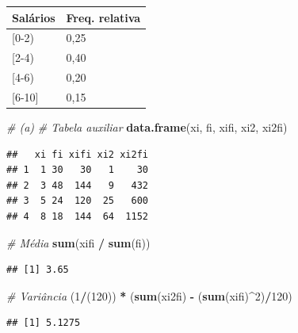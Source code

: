 \documentclass[]{article}
\newenvironment{Shaded}{\begin{snugshade}}{\end{snugshade}}
\newcommand{\KeywordTok}[1]{\textcolor[rgb]{0.13,0.29,0.53}{\textbf{#1}}}
\newcommand{\DecValTok}[1]{\textcolor[rgb]{0.00,0.00,0.81}{#1}}
\newcommand{\StringTok}[1]{\textcolor[rgb]{0.31,0.60,0.02}{#1}}
\newcommand{\CommentTok}[1]{\textcolor[rgb]{0.56,0.35,0.01}{\textit{#1}}}
\newcommand{\OperatorTok}[1]{\textcolor[rgb]{0.81,0.36,0.00}{\textbf{#1}}}
\newcommand{\NormalTok}[1]{#1}
\begin{document}
\begin{table}[H]
\centering
\begin{tabular}{ll}
\hline
Salários   & Freq. relativa \\ \hline
{[}0-2)    & 0,25           \\
{[}2-4)    & 0,40           \\
{[}4-6)    & 0,20           \\
{[}6-10{]} & 0,15           \\ \hline
\end{tabular}
\end{table}

\begin{Shaded}
\begin{Highlighting}[]
\CommentTok{# (a)}
\CommentTok{# Tabela auxiliar}
\KeywordTok{data.frame}\NormalTok{(xi, fi, xifi, xi2, xi2fi)}
\end{Highlighting}
\end{Shaded}

\begin{verbatim}
##   xi fi xifi xi2 xi2fi
## 1  1 30   30   1    30
## 2  3 48  144   9   432
## 3  5 24  120  25   600
## 4  8 18  144  64  1152
\end{verbatim}

\begin{Shaded}
\begin{Highlighting}[]
\CommentTok{# Média}
\KeywordTok{sum}\NormalTok{(xifi }\OperatorTok{/}\StringTok{ }\KeywordTok{sum}\NormalTok{(fi))}
\end{Highlighting}
\end{Shaded}

\begin{verbatim}
## [1] 3.65
\end{verbatim}

\begin{Shaded}
\begin{Highlighting}[]
\CommentTok{# Variância}
\NormalTok{(}\DecValTok{1}\OperatorTok{/}\NormalTok{(}\DecValTok{120}\NormalTok{)) }\OperatorTok{*}\StringTok{ }\NormalTok{(}\KeywordTok{sum}\NormalTok{(xi2fi) }\OperatorTok{-}\StringTok{ }\NormalTok{(}\KeywordTok{sum}\NormalTok{(xifi)}\OperatorTok{^}\DecValTok{2}\NormalTok{)}\OperatorTok{/}\DecValTok{120}\NormalTok{)}
\end{Highlighting}
\end{Shaded}

\begin{verbatim}
## [1] 5.1275
\end{verbatim}
\end{document}
